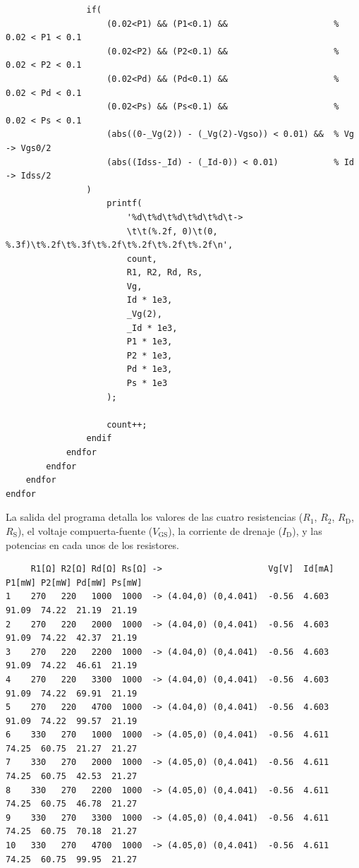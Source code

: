 \documentclass[letter,twoside,11pt]{article}
\begin{document}
\begin{shaded}
\begin{verbatim}
                if(
                    (0.02<P1) && (P1<0.1) &&                     % 0.02 < P1 < 0.1
                    (0.02<P2) && (P2<0.1) &&                     % 0.02 < P2 < 0.1
                    (0.02<Pd) && (Pd<0.1) &&                     % 0.02 < Pd < 0.1
                    (0.02<Ps) && (Ps<0.1) &&                     % 0.02 < Ps < 0.1
                    (abs((0-_Vg(2)) - (_Vg(2)-Vgso)) < 0.01) &&  % Vg -> Vgs0/2
                    (abs((Idss-_Id) - (_Id-0)) < 0.01)           % Id -> Idss/2
                )
                    printf(
                        '%d\t%d\t%d\t%d\t%d\t->
                        \t\t(%.2f, 0)\t(0, %.3f)\t%.2f\t%.3f\t%.2f\t%.2f\t%.2f\t%.2f\n',
                        count,
                        R1, R2, Rd, Rs,
                        Vg,
                        Id * 1e3,
                        _Vg(2),
                        _Id * 1e3,
                        P1 * 1e3,
                        P2 * 1e3,
                        Pd * 1e3,
                        Ps * 1e3
                    );

                    count++;
                endif
            endfor
        endfor
    endfor
endfor

\end{verbatim}
\end{shaded}
\normalsize

La salida del programa detalla los valores de las cuatro resistencias ($R_1$,
$R_2$, $R_{\text{D}}$, $R_{\text{S}}$), el voltaje compuerta-fuente
($V_{\text{GS}}$), la corriente de drenaje ($I_{\text{D}}$), y las potencias
en cada unos de los resistores.

\footnotesize
\begin{shaded}
\begin{verbatim}
     R1[Ω] R2[Ω] Rd[Ω] Rs[Ω] ->                     Vg[V]  Id[mA]   P1[mW] P2[mW] Pd[mW] Ps[mW]
1    270   220   1000  1000  -> (4.04,0) (0,4.041)  -0.56  4.603    91.09  74.22  21.19  21.19
2    270   220   2000  1000  -> (4.04,0) (0,4.041)  -0.56  4.603    91.09  74.22  42.37  21.19
3    270   220   2200  1000  -> (4.04,0) (0,4.041)  -0.56  4.603    91.09  74.22  46.61  21.19
4    270   220   3300  1000  -> (4.04,0) (0,4.041)  -0.56  4.603    91.09  74.22  69.91  21.19
5    270   220   4700  1000  -> (4.04,0) (0,4.041)  -0.56  4.603    91.09  74.22  99.57  21.19
6    330   270   1000  1000  -> (4.05,0) (0,4.041)  -0.56  4.611    74.25  60.75  21.27  21.27
7    330   270   2000  1000  -> (4.05,0) (0,4.041)  -0.56  4.611    74.25  60.75  42.53  21.27
8    330   270   2200  1000  -> (4.05,0) (0,4.041)  -0.56  4.611    74.25  60.75  46.78  21.27
9    330   270   3300  1000  -> (4.05,0) (0,4.041)  -0.56  4.611    74.25  60.75  70.18  21.27
10   330   270   4700  1000  -> (4.05,0) (0,4.041)  -0.56  4.611    74.25  60.75  99.95  21.27
\end{verbatim}
\end{shaded}
\normalsize
\end{document}
